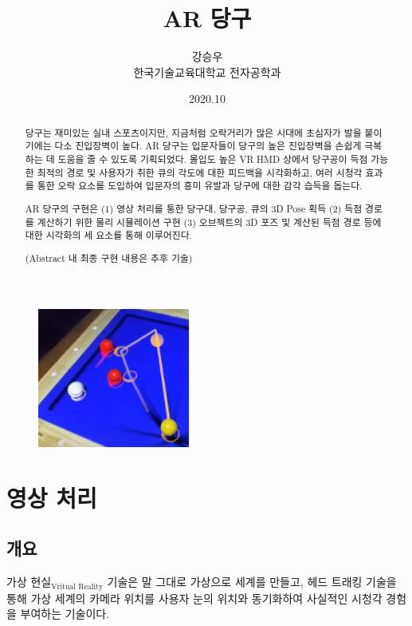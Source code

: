\documentclass[11pt]{oblivoir}
\title{AR 당구}
\author{강승우 \\ 한국기술교육대학교 전자공학과}
\date{2020.10}
\begin{document}
\maketitle

\begin{figure}[ht]
    \centering
    \includegraphics[width=5cm]{img/abstract-final.png}
\end{figure}

\begin{abstract}
    당구는 재미있는 실내 스포츠이지만, 지금처럼 오락거리가 많은 시대에 초심자가 발을 붙이기에는 다소 진입장벽이 높다. AR 당구는 입문자들이 당구의 높은 진입장벽을 손쉽게 극복하는 데 도움을 줄 수 있도록 기획되었다. 몰입도 높은 VR HMD \footnotemark 상에서 당구공이 득점 가능한 최적의 경로 및 사용자가 취한 큐의 각도에 대한 피드백을 시각화하고, 여러 시청각 효과를 통한 오락 요소를 도입하여 입문자의 흥미 유발과 당구에 대한 감각 습득을 돕는다.

    AR 당구의 구현은 (1) 영상 처리를 통한 당구대, 당구공, 큐의 3D Pose 획득 (2) 득점 경로를 계산하기 위한 물리 시뮬레이션 구현 (3) 오브젝트의 3D 포즈 및 계산된 득점 경로 등에 대한 시각화의 세 요소를 통해 이루어진다.

    (Abstract 내 최종 구현 내용은 추후 기술)
\end{abstract}

\newpage


\section{영상 처리}
\subsection{개요}
    가상 현실$_\text{Vritual Reality}$ 기술은 말 그대로 가상으로 세계를 만들고, 헤드 트래킹 기술을 통해 가상 세계의 카메라 위치를 사용자 눈의 위치와 동기화하여 사실적인 시청각 경험을 부여하는 기술이다.
\end{document}
